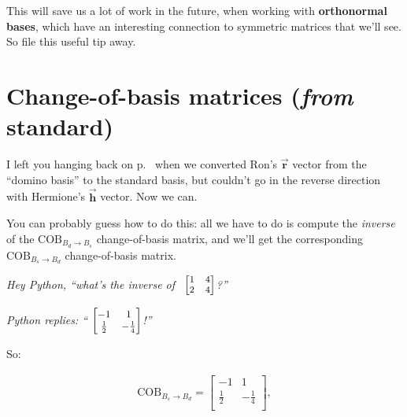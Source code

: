 
This will save us a lot of work in the future, when working with
\textbf{orthonormal bases}, which have an interesting connection to symmetric
matrices that we'll see. So file this useful tip away.


\section[Change-of-basis matrices]{\large Change-of-basis matrices (\textit{from} standard)}

\label{changeOfBasisOtherWayFinally}


I left you hanging back on p.~\pageref{changeOfBasisOtherWayCliffhanger} when
we converted Ron's $\overrightarrow{\textbf{r}}$ vector from the ``domino
basis'' to the standard basis, but couldn't go in the reverse direction with
Hermione's $\overrightarrow{\textbf{h}}$ vector. Now we can.

\smallskip
You can probably guess how to do this: all we have to do is compute the
\textit{inverse} of the $\textrm{COB}_{B_d \rightarrow B_s}$ change-of-basis
matrix, and we'll get the corresponding $\textrm{COB}_{B_s \rightarrow B_d}$
change-of-basis matrix.

\begin{center}
\textit{Hey Python, ``what's the inverse of \
${\footnotesize \begin{bmatrix}
1 & 4 \\
2 & 4 \\
\end{bmatrix}}$?''
}

\textit{Python replies: ``
${\small
\begingroup
\begin{bmatrix}
-1 & 1 \\
\frac{1}{2} & -\frac{1}{4} \\
\end{bmatrix}
\endgroup}$!''
}
\end{center}

So:

\vspace{-.15in}
\begin{align*}
\textrm{COB}_{B_s \rightarrow B_d} =
\begin{bmatrix}
-1 & 1 \\
\frac{1}{2} & -\frac{1}{4} \\
\end{bmatrix},
\end{align*}
\vspace{-.15in}

